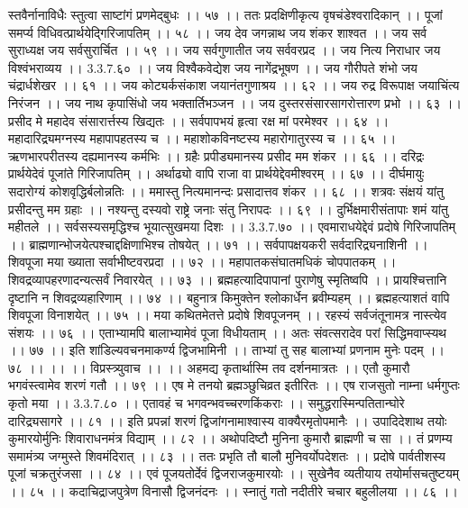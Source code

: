 स्तवैर्नानाविधैः स्तुत्वा साष्टांगं प्रणमेद्बुधः ।। ५७ ।।
ततः प्रदक्षिणीकृत्य वृषचंडेश्वरादिकान् ।।
पूजां समर्प्य विधिवत्प्रार्थयेद्गिरिजापतिम् ।। ५८ ।।
जय देव जगन्नाथ जय शंकर शाश्वत ।।
जय सर्व सुराध्यक्ष जय सर्वसुरार्चित ।। ५९ ।।
जय सर्वगुणातीत जय सर्ववरप्रद ।।
जय नित्य निराधार जय विश्वंभराव्यय ।। 3.3.7.६० ।।
जय विश्वैकवेद्येश जय नागेंद्रभूषण ।।
जय गौरीपते शंभो जय चंद्रार्धशेखर ।। ६१ ।।
जय कोट्यर्कसंकाश जयानंतगुणाश्रय ।। ६२ ।।
जय रुद्र विरूपाक्ष जयाचिंत्य निरंजन ।।
जय नाथ कृपासिंधो जय भक्तार्तिभञ्जन ।।
जय दुस्तरसंसारसागरोत्तारण प्रभो ।। ६३ ।।
प्रसीद मे महादेव संसारार्त्तस्य खिद्यतः ।।
सर्वपापभयं हृत्वा रक्ष मां परमेश्वर ।। ६४ ।।
महादारिद्र्यमग्नस्य महापापहतस्य च ।।
महाशोकविनष्टस्य महारोगातुरस्य च ।। ६५ ।।
ऋणभारपरीतस्य दह्यमानस्य कर्मभिः ।।
ग्रहैः प्रपीड्यमानस्य प्रसीद मम शंकर ।। ६६ ।।
दरिद्रः प्रार्थयेदेवं पूजांते गिरिजापतिम् ।।
अर्थाढ्यो वापि राजा वा प्रार्थयेद्देवमीश्वरम् ।। ६७ ।।
दीर्घमायुः सदारोग्यं कोशवृद्धिर्बलोन्नतिः ।।
ममास्तु नित्यमानन्दः प्रसादात्तव शंकर ।। ६८ ।।
शत्रवः संक्षयं यांतु प्रसीदन्तु मम ग्रहाः ।।
नश्यन्तु दस्यवो राष्ट्रे जनाः संतु निरापदः ।। ६९ ।।
दुर्भिक्षमारीसंतापाः शमं यांतु महीतले ।।
सर्वसस्यसमृद्धिश्च भूयात्सुखमया दिशः ।। 3.3.7.७० ।।
एवमाराधयेद्देवं प्रदोषे गिरिजापतिम् ।।
ब्राह्मणान्भोजयेत्पश्चाद्दक्षिणाभिश्च तोषयेत् ।। ७१ ।।
सर्वपापक्षयकरी सर्वदारिद्र्यनाशिनी ।।
शिवपूजा मया ख्याता सर्वाभीष्टवरप्रदा ।। ७२ ।।
महापातकसंघातमधिकं चोपपातकम् ।।
शिवद्रव्यापहरणादन्यत्सर्वं निवारयेत् ।। ७३ ।।
ब्रह्महत्यादिपापानां पुराणेषु स्मृतिष्वपि ।।
प्रायश्चित्तानि दृष्टानि न शिवद्रव्यहारिणाम् ।। ७४ ।।
बहुनात्र किमुक्तेन श्लोकार्धेन ब्रवीम्यहम् ।।
ब्रह्महत्याशतं वापि शिवपूजा विनाशयेत् ।। ७५ ।।
मया कथितमेतत्ते प्रदोषे शिवपूजनम् ।।
रहस्यं सर्वजंतूनामत्र नास्त्येव संशयः ।। ७६ ।।
एताभ्यामपि बालाभ्यामेवं पूजा विधीयताम् ।।
अतः संवत्सरादेव परां सिद्धिमवाप्स्यथ ।। ७७ ।।
इति शांडिल्यवचनमाकर्ण्य द्विजभामिनी ।।
ताभ्यां तु सह बालाभ्यां प्रणनाम मुनेः पदम् ।। ७८ ।। ।।
।। विप्रस्त्र्युवाच ।। ।।
अहमद्य कृतार्थास्मि तव दर्शनमात्रतः ।।
एतौ कुमारौ भगवंस्त्वामेव शरणं गतौ ।। ७९ ।।
एष मे तनयो ब्रह्मञ्छुचिव्रत इतीरितः ।।
एष राजसुतो नाम्ना धर्मगुप्तः कृतो मया ।। 3.3.7.८० ।।
एतावहं च भगवन्भवच्चरणकिंकराः ।।
समुद्धरास्मिन्पतितान्घोरे दारिद्र्यसागरे ।। ८१ ।।
इति प्रपन्नां शरणं द्विजांगनामाश्वास्य वाक्यैरमृतोपमानैः ।।
उपादिदेशाथ तयोः कुमारयोर्मुनिः शिवाराधनमंत्र विद्याम् ।। ८२ ।।
अथोपदिष्टौ मुनिना कुमारौ ब्राह्मणी च सा ।।
तं प्रणम्य समामंत्र्य जग्मुस्ते शिवमंदिरात् ।। ८३ ।।
ततः प्रभृति तौ बालौ मुनिवर्योपदेशतः ।।
प्रदोषे पार्वतीशस्य पूजां चक्रतुरंजसा ।। ८४ ।।
एवं पूजयतोर्देवं द्विजराजकुमारयोः ।।
सुखेनैव व्यतीयाय तयोर्मासचतुष्टयम् ।। ८५ ।।
कदाचिद्राजपुत्रेण विनासौ द्विजनंदनः ।।
स्नातुं गतो नदीतीरे चचार बहुलीलया ।। ८६ ।।
